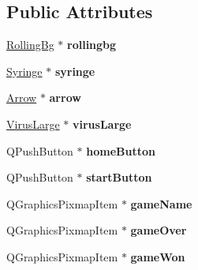 \subsection*{Public Attributes}
\begin{DoxyCompactItemize}
\item 
\hypertarget{classGame1scene_aab61ae4ec9c39f1b656e0e4e0dd70410}{\hyperlink{classRollingBg}{Rolling\-Bg} $\ast$ {\bfseries rollingbg}}\label{classGame1scene_aab61ae4ec9c39f1b656e0e4e0dd70410}

\item 
\hypertarget{classGame1scene_a2ff871911459d5e25abd0754ebb2a122}{\hyperlink{classSyringe}{Syringe} $\ast$ {\bfseries syringe}}\label{classGame1scene_a2ff871911459d5e25abd0754ebb2a122}

\item 
\hypertarget{classGame1scene_a97e016dd019d53a5d96e80aa6ba49437}{\hyperlink{classArrow}{Arrow} $\ast$ {\bfseries arrow}}\label{classGame1scene_a97e016dd019d53a5d96e80aa6ba49437}

\item 
\hypertarget{classGame1scene_a3be41ab6d1774a4ed4cb52d6d71992ef}{\hyperlink{classVirusLarge}{Virus\-Large} $\ast$ {\bfseries virus\-Large}}\label{classGame1scene_a3be41ab6d1774a4ed4cb52d6d71992ef}

\item 
\hypertarget{classGame1scene_a27d93b7703a0afb753f1c40e60667656}{Q\-Push\-Button $\ast$ {\bfseries home\-Button}}\label{classGame1scene_a27d93b7703a0afb753f1c40e60667656}

\item 
\hypertarget{classGame1scene_afcac285a4f978842c628dddfea9cb694}{Q\-Push\-Button $\ast$ {\bfseries start\-Button}}\label{classGame1scene_afcac285a4f978842c628dddfea9cb694}

\item 
\hypertarget{classGame1scene_a2dc8ee364d557d063dc9176abe3a8a86}{Q\-Graphics\-Pixmap\-Item $\ast$ {\bfseries game\-Name}}\label{classGame1scene_a2dc8ee364d557d063dc9176abe3a8a86}

\item 
\hypertarget{classGame1scene_a71e60cb75619e8cec5edb8b4d155cbc7}{Q\-Graphics\-Pixmap\-Item $\ast$ {\bfseries game\-Over}}\label{classGame1scene_a71e60cb75619e8cec5edb8b4d155cbc7}

\item 
\hypertarget{classGame1scene_a49d0e072e375bb9e43e2e534db60b0c2}{Q\-Graphics\-Pixmap\-Item $\ast$ {\bfseries game\-Won}}\label{classGame1scene_a49d0e072e375bb9e43e2e534db60b0c2}


\end{DoxyCompactItemize}
